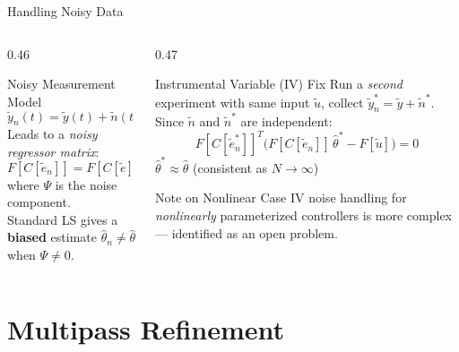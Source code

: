 \documentclass[hyperref={pdfpagemode=FullScreen},aspectratio=169]{beamer}
\newcommand{\alerttext}[1]{{\color{alertred}\textbf{#1}}}
\begin{document}
\begin{frame}{Handling Noisy Data}
  \begin{columns}[T]
    \begin{column}{0.46\textwidth}
      \begin{alertblock}{Noisy Measurement Model}
        \[
          \tilde{y}_n(t) = \tilde{y}(t) + \tilde{n}(t)
        \]
        Leads to a \emph{noisy regressor matrix}:
        \[
          F[C[\tilde{e}_n]] = F[C[\tilde{e}]] + \Psi
        \]
        where $\Psi$ is the noise component.\\[0.4em]
        Standard LS gives a \alerttext{biased} estimate $\hat\theta_n \neq \hat\theta$ when $\Psi \neq 0$.
      \end{alertblock}
    \end{column}
    \begin{column}{0.47\textwidth}
      \begin{exampleblock}{Instrumental Variable (IV) Fix}
        Run a \emph{second} experiment with same input $\tilde{u}$, collect $\tilde{y}^*_n = \tilde{y} + \tilde{n}^*$.\\[0.3em]
        Since $\tilde{n}$ and $\tilde{n}^*$ are independent:
        \[
          F[C[\tilde{e}^*_n]]^T\bigl(F[C[\tilde{e}_n]]\,\hat\theta^* - F[\tilde{u}]\bigr) = 0
        \]
        $\hat\theta^* \approx \hat\theta$ (consistent as $N\to\infty$)
      \end{exampleblock}
      \vspace{0.3em}
      \begin{block}{Note on Nonlinear Case}
        IV noise handling for \emph{nonlinearly} parameterized controllers is more complex --- identified as an open problem.
      \end{block}
    \end{column}
  \end{columns}
\end{frame}

\section{Multipass Refinement}
\end{document}
